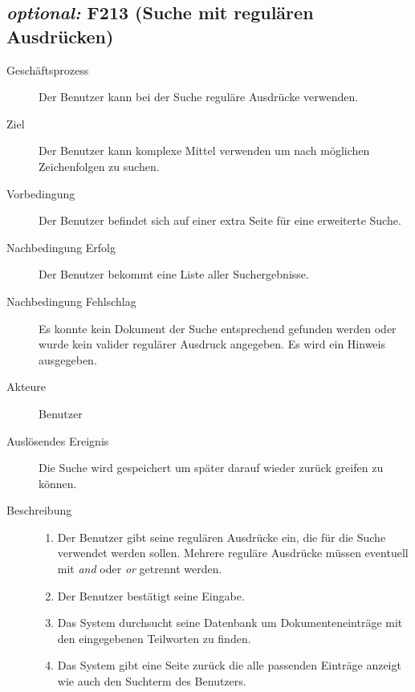 \subsection{\emph{optional:} F213 (Suche mit regulären Ausdrücken)}
\label{F:regexSuche}
\begin{description}
  \item[Geschäftsprozess]Der Benutzer kann bei der Suche reguläre Ausdrücke verwenden.
  \item[Ziel]Der Benutzer kann komplexe Mittel verwenden um nach möglichen Zeichenfolgen zu suchen.
  \item[Vorbedingung]Der Benutzer befindet sich auf einer extra Seite für eine erweiterte Suche.
  \item[Nachbedingung Erfolg]Der Benutzer bekommt eine Liste aller Suchergebnisse.
  \item[Nachbedingung Fehlschlag]Es konnte kein Dokument der Suche entsprechend gefunden werden oder wurde kein valider regulärer Ausdruck angegeben. Es wird ein Hinweis ausgegeben.
  \item[Akteure]Benutzer
  \item[Auslösendes Ereignis]Die Suche wird gespeichert um später darauf wieder zurück greifen zu können.
  \item[Beschreibung]\hfill
    \begin{enumerate}
      \item Der Benutzer gibt seine regulären Ausdrücke ein, die für die Suche verwendet werden sollen. Mehrere reguläre Ausdrücke müssen eventuell mit \emph{and} oder \emph{or} getrennt werden.
      \item Der Benutzer bestätigt seine Eingabe.
      \item Das System durchsucht seine Datenbank um Dokumenteneinträge mit den eingegebenen Teilworten zu finden.
      \item Das System gibt eine Seite zurück die alle passenden Einträge anzeigt wie auch den Suchterm des Benutzers.
    \end{enumerate}
\end{description}

